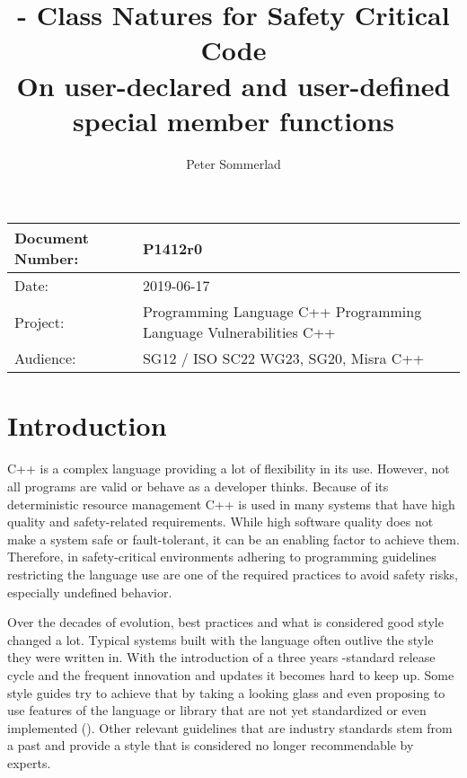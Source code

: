 \documentclass[ebook,11pt,article]{memoir}
\title{\papernumber{} - Class Natures for Safety Critical Code \\
On user-declared and user-defined special member functions}
\author{Peter Sommerlad}
\date{\paperdate}                %
\newcommand{\papernumber}{P1412r0}
\newcommand{\paperdate}{2019-06-17}
\begin{document}
\maketitle
\begin{center}
\begin{tabular}[t]{|l|p{8cm}|}\hline 
Document Number:&  \papernumber \\\hline
Date: & \paperdate \\\hline
Project: & Programming Language C++ \newline Programming Language Vulnerabilities C++\\\hline 
Audience: & SG12 / ISO SC22 WG23, SG20, Misra C++\\\hline
\end{tabular}
\end{center}


\chapter{Introduction}

C++ is a complex language providing a lot of flexibility in its use. However, not all programs are valid or behave as a developer thinks. Because of its deterministic resource management C++ is used in many systems that have high quality and safety-related requirements. While high software quality does not make a system safe or fault-tolerant, it can be an enabling factor to achieve them. Therefore, in safety-critical environments adhering to programming guidelines restricting the language use are one of the required practices to avoid safety risks, especially undefined behavior.

Over the decades of \Cpp{} evolution, best practices and what is considered good style changed a lot. Typical systems built with the language often outlive the style they were written in. With the introduction of a three years \Cpp{}-standard release cycle and the frequent innovation and updates it becomes hard to keep up. Some style guides try to achieve that by taking a looking glass and even proposing to use features of the language or library that are not yet standardized or even implemented (\cite{CppCGL}). Other relevant guidelines that are industry standards stem from a past and provide a style that is considered no longer recommendable by \Cpp{} experts.
\end{document}
